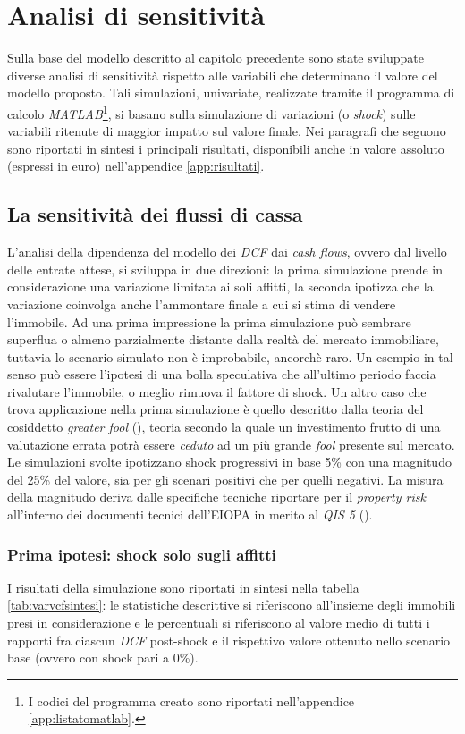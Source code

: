 \chapter{Analisi di sensitività}
\label{chap:ansens}
Sulla base del modello descritto al capitolo precedente sono state sviluppate diverse analisi di sensitività rispetto alle variabili che determinano il valore del modello proposto. Tali simulazioni, univariate, realizzate tramite il programma di calcolo \textit{MATLAB}\footnote{I codici del programma creato sono riportati nell'appendice \ref{app:listatomatlab}.}, si basano sulla simulazione di variazioni (o \textit{shock}) sulle variabili ritenute di maggior impatto sul valore finale. Nei paragrafi che seguono sono riportati in sintesi i principali risultati, disponibili anche in valore assoluto (espressi in euro) nell'appendice \ref{app:risultati}.

\section{La sensitività dei flussi di cassa}
\label{sec:simvcf}
L'analisi della dipendenza del modello dei \textit{DCF} dai {\itshape cash flows}, ovvero dal livello delle entrate attese, si sviluppa in due direzioni: la prima simulazione prende in considerazione una variazione limitata ai soli affitti, la seconda  ipotizza che la variazione coinvolga anche l'ammontare finale a cui si stima di vendere l'immobile.
Ad una prima impressione la prima simulazione può sembrare superflua o almeno parzialmente distante dalla realtà del mercato immobiliare, tuttavia lo scenario simulato non è improbabile, ancorchè raro. Un esempio in tal senso può essere l'ipotesi di una bolla speculativa che all'ultimo periodo faccia rivalutare l'immobile, o meglio rimuova il fattore di shock. Un altro caso che trova applicazione nella prima simulazione è quello descritto dalla teoria del cosiddetto {\itshape greater fool} (\cite[p. 203]{geltner}), teoria secondo la quale un investimento frutto di una valutazione errata potrà essere \textit{ceduto} ad un più grande \textit{fool} presente sul mercato.
Le simulazioni svolte ipotizzano shock progressivi in base 5\% con una magnitudo del 25\% del valore, sia per gli scenari positivi che per quelli negativi. La misura della magnitudo deriva dalle specifiche tecniche riportare per il {\itshape property risk} all'interno dei documenti tecnici dell'EIOPA in merito al {\itshape QIS 5} (\cite[p. 174]{qistechnical}).

\subsection{Prima ipotesi: shock solo sugli affitti}
\label{subs:vcf1}
I risultati della simulazione sono riportati in sintesi nella tabella \ref{tab:varvcfsintesi}: le statistiche descrittive si riferiscono all'insieme degli immobili presi in considerazione e le percentuali si riferiscono al valore medio di tutti i rapporti fra ciascun \textit{DCF} post-shock e il rispettivo valore ottenuto nello scenario base (ovvero con shock pari a 0\%).


